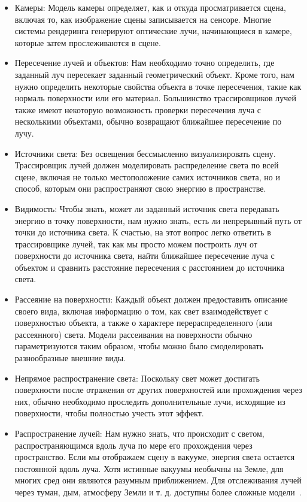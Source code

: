 \begin{itemize}[label*=---]
    \item Камеры: Модель камеры определяет, как и откуда просматривается сцена, включая то, как 
        изображение сцены записывается на сенсоре. Многие системы рендеринга генерируют оптические 
        лучи, начинающиеся в камере, которые затем прослеживаются в сцене.

    \item Пересечение лучей и объектов: Нам необходимо точно определить, где заданный луч пересекает 
        заданный геометрический объект. Кроме того, нам нужно определить некоторые свойства объекта 
        в точке пересечения, такие как нормаль поверхности или его материал. Большинство 
        трассировщиков лучей также имеют некоторую возможность проверки пересечения луча с 
        несколькими объектами, обычно возвращают ближайшее пересечение по лучу.

    \item Источники света: Без освещения бессмысленно визуализировать сцену. Трассировщик лучей 
        должен моделировать распределение света по всей сцене, включая не только местоположение 
        самих источников света, но и способ, которым они распространяют свою энергию в пространстве.

    \item Видимость: Чтобы знать, может ли заданный источник света передавать энергию в точку 
        поверхности, нам нужно знать, есть ли непрерывный путь от точки до источника света. 
        К счастью, на этот вопрос легко ответить в трассировщике лучей, так как мы просто 
        можем построить луч от поверхности до источника света, найти ближайшее пересечение луча
        с объектом и сравнить расстояние пересечения с расстоянием до источника света.

    \item Рассеяние на поверхности: Каждый объект должен предоставить описание своего вида, 
        включая информацию о том, как свет взаимодействует с поверхностью объекта, а также о
        характере перераспределенного (или рассеянного) света. Модели рассеивания на поверхности 
        обычно параметризуются таким образом, чтобы можно было смоделировать разнообразные внешние виды.

    \item Непрямое распространение света: Поскольку свет может достигать поверхности после отражения 
        от других поверхностей или прохождения через них, обычно необходимо проследить дополнительные 
        лучи, исходящие из поверхности, чтобы полностью учесть этот эффект.

    \item Распространение лучей: Нам нужно знать, что происходит с светом, распространяющимся вдоль 
        луча по мере его прохождения через пространство. Если мы отображаем сцену в вакууме, 
        энергия света остается постоянной вдоль луча. Хотя истинные вакуумы необычны на Земле, 
        для многих сред они являются разумным приближением. Для отслеживания лучей через туман, 
        дым, атмосферу Земли и т. д. доступны более сложные модели~\cite{PBRT3e}.
\end{itemize}

